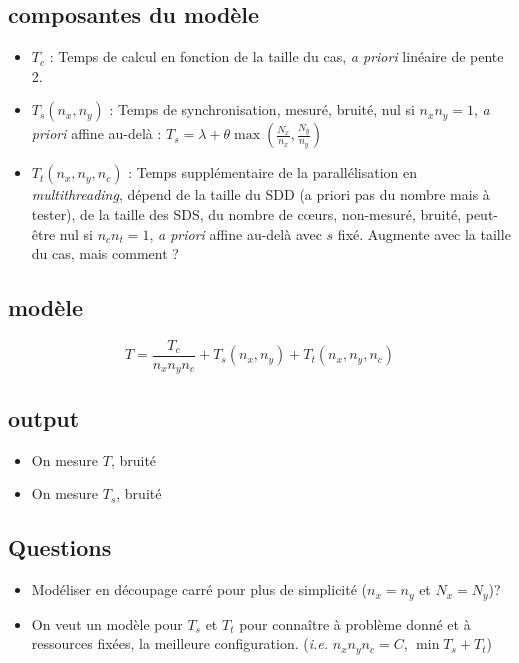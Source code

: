 \documentclass[12pt]{memoir}
\begin{document}
\subsection*{composantes du modèle}

\begin{itemize}
\item $T_c$ : Temps de calcul en fonction de la taille du cas, \textit{a priori} linéaire de pente 2.
\item $T_s(n_x, n_y)$ : Temps de synchronisation, mesuré, bruité, nul si $n_xn_y = 1$, \textit{a priori} affine au-delà : $T_s = \lambda + \theta \max(\frac{N_x}{n_x},\frac{N_y}{n_y})$
\item $T_t(n_x, n_y, n_c)$ : Temps supplémentaire de la parallélisation en \textit{multithreading}, dépend de la taille du SDD (a priori pas du nombre mais à tester), de la taille des SDS, du nombre de c\oe urs, non-mesuré, bruité, peut-\^etre nul si $n_c n_t = 1$, \textit{a priori} affine au-delà avec $s$ fixé. Augmente avec la taille du cas, mais comment ?
\end{itemize}

\subsection{modèle}

$$T = \frac{T_c}{n_x n_y n_c} + T_s(n_x, n_y) + T_t(n_x, n_y, n_c)$$

\subsection*{output}
\begin{itemize}
\item On mesure $T$, bruité
\item On mesure $T_s$, bruité
\end{itemize}

\subsection*{Questions}
\begin{itemize}
\item Modéliser en découpage carré pour plus de simplicité ($n_x = n_y$ et $N_x = N_y$)?
\item On veut un modèle pour $T_s$ et $T_t$ pour conna\^itre à problème donné et à ressources fixées, la meilleure configuration. (\textit{i.e.} $n_x n_y n_c = C$, $\min T_s  + T_t$) 
\end{itemize}
\end{document}
